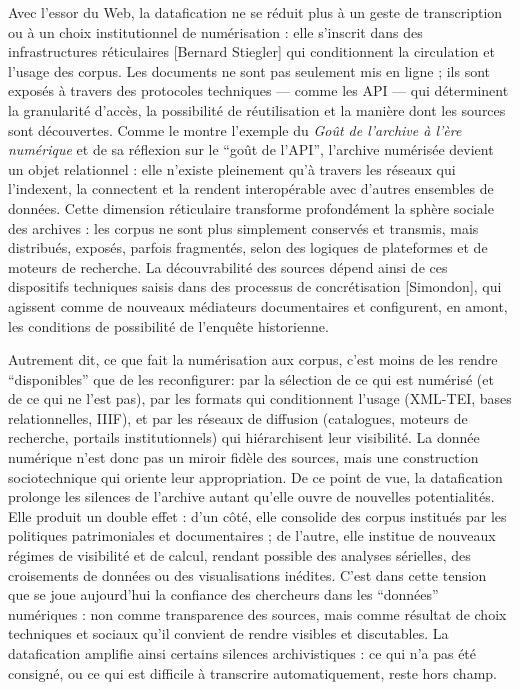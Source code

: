Avec l’essor du Web, la datafication ne se réduit plus à un geste de transcription ou à un choix institutionnel de numérisation : elle s’inscrit dans des infrastructures réticulaires [Bernard Stiegler] qui conditionnent la circulation et l’usage des corpus. Les documents ne sont pas seulement mis en ligne ; ils sont exposés à travers des protocoles techniques — comme les API — qui déterminent la granularité d’accès, la possibilité de réutilisation et la manière dont les sources sont découvertes. Comme le montre l’exemple du \emph{Goût de l’archive à l’ère numérique} et de sa réflexion sur le \enquote{goût de l’API}, l’archive numérisée devient un objet relationnel : elle n’existe pleinement qu’à travers les réseaux qui l’indexent, la connectent et la rendent interopérable avec d’autres ensembles de données. Cette dimension réticulaire transforme profondément la sphère sociale des archives : les corpus ne sont plus simplement conservés et transmis, mais distribués, exposés, parfois fragmentés, selon des logiques de plateformes et de moteurs de recherche. La découvrabilité des sources dépend ainsi de ces dispositifs techniques saisis dans des processus de concrétisation [Simondon], qui agissent comme de nouveaux médiateurs documentaires et configurent, en amont, les conditions de possibilité de l’enquête historienne. 

Autrement dit, ce que fait la numérisation aux corpus, c’est moins de les rendre \enquote{disponibles} que de les reconfigurer: par la sélection de ce qui est numérisé (et de ce qui ne l’est pas), par les formats qui conditionnent l’usage (XML-TEI, bases relationnelles, IIIF), et par les réseaux de diffusion (catalogues, moteurs de recherche, portails institutionnels) qui hiérarchisent leur visibilité. La donnée numérique n’est donc pas un miroir fidèle des sources, mais une construction sociotechnique qui oriente leur appropriation. De ce point de vue, la datafication prolonge les silences de l’archive autant qu’elle ouvre de nouvelles potentialités. Elle produit un double effet : d’un côté, elle consolide des corpus institués par les politiques patrimoniales et documentaires ; de l’autre, elle institue de nouveaux régimes de visibilité et de calcul, rendant possible des analyses sérielles, des croisements de données ou des visualisations inédites. C’est dans cette tension que se joue aujourd’hui la confiance des chercheurs dans les \enquote{données} numériques : non comme transparence des sources, mais comme résultat de choix techniques et sociaux qu’il convient de rendre visibles et discutables. La datafication amplifie ainsi certains silences archivistiques : ce qui n’a pas été consigné, ou ce qui est difficile à transcrire automatiquement, reste hors champ.

